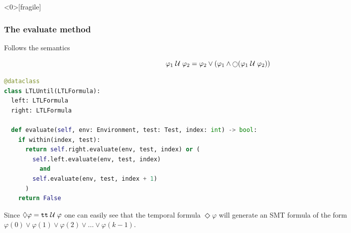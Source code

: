 \begin{frame}<0>[fragile]
  \frametitle{The evaluate method} \small

\begin{block}{Follows the semantics}

\[
\varphi_1 \until \varphi_2 = \varphi_2 \vee (\varphi_1 \wedge \Next (\varphi_1 \until \varphi_2))
\]
\end{block}

\begin{lstlisting}[language=python,frame=single]
@dataclass
class LTLUntil(LTLFormula):
  left: LTLFormula
  right: LTLFormula

  def evaluate(self, env: Environment, test: Test, index: int) -> bool:
    if within(index, test):
      return self.right.evaluate(env, test, index) or (
        self.left.evaluate(env, test, index) 
          and 
        self.evaluate(env, test, index + 1)
      )
    return False
\end{lstlisting}

\pause

Since $\Diamond \varphi = \tt{tt} \;{\cal U}\; \varphi\tt$ one can easily see that
the temporal formula $\Diamond \varphi$ will generate an SMT formula of the form 
$\varphi(0)  \vee \varphi(1) \vee \varphi(2)  \vee ... \vee \varphi(k-1)$.


\end{frame}
